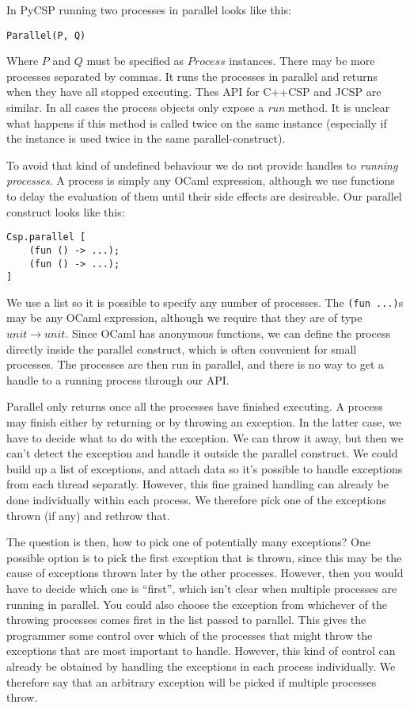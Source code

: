 \documentclass[a4paper,12pt]{article}
\begin{document}
In PyCSP running two processes in parallel looks like this:
\begin{verbatim}
Parallel(P, Q)
\end{verbatim}
Where $P$ and $Q$ must be specified as $Process$ instances. There may be more processes
separated by commas. It runs the processes in parallel and returns when they have all 
stopped executing. Thes API for C++CSP and JCSP are similar. In all cases the
process objects only expose a \emph{run} method. It is unclear what happens if
this method is called twice on the same instance (especially if the instance is
used twice in the same parallel-construct).

To avoid that kind of undefined behaviour we do not provide handles to 
\emph{running processes}.
A process is simply any OCaml expression, although we use functions to delay the 
evaluation of them until their side effects are desireable. 
Our parallel construct looks like this:

\begin{verbatim}
Csp.parallel [
    (fun () -> ...);
    (fun () -> ...);
]
\end{verbatim}

We use a list so it is possible to specify any number of processes. The 
\verb|(fun ...)|s may be any OCaml expression, although we require that they are of type
$unit \to unit$. Since OCaml has anonymous functions, we can define the process directly 
inside the parallel construct, which is often convenient for small processes. The processes
are then run in parallel, and there is no way to get a handle to a running process
through our API.

Parallel only returns once all the processes have finished executing. A process
may finish either by returning or by throwing an exception. In the latter case,
we have to decide what to do with the exception. We can throw it away, but then
we can't detect the exception and handle it outside the parallel construct. We
could build up a list of exceptions, and attach data so it's possible to handle
exceptions from each thread separatly. However, this fine grained handling can
already be done individually within each process. We therefore pick one of the
exceptions thrown (if any) and rethrow that. 

The question is then, how to pick
one of potentially many exceptions? One possible option is to pick the first
exception that is thrown, since this may be the cause of exceptions thrown later
by the other processes. However, then you would have to decide which one is
``first'', which isn't clear when multiple processes are running in parallel.
You could also choose the exception from whichever of the throwing processes
comes first in the list passed to parallel. This gives the programmer some
control over which of the processes that might throw the exceptions that are
most important to handle. However, this kind of control can already be obtained
by handling the exceptions in each process individually. We therefore say that
an arbitrary exception will be picked if multiple processes throw.
\end{document}
